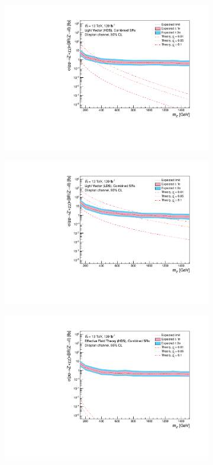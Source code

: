 \documentclass[12pt, a4paper]{book}
\begin{document}
\begin{figure}[!ht]
\begin{subfigure}[b]{0.49\textwidth}
      \centering
      \includegraphics[width=1\textwidth]{Limits/Model_independent/LV_HDS/mass_exclusion_comb.pdf}
   \end{subfigure}
   \hfill
   \begin{subfigure}[b]{0.49\textwidth}
      \centering
      \includegraphics[width=1\textwidth]{Limits/Model_independent/LV_LDS/mass_exclusion_comb.pdf}
   \end{subfigure}
   \hfill
	\begin{subfigure}[b]{0.49\textwidth}
      \centering
      \includegraphics[width=1\textwidth]{Limits/Model_independent/EFT_HDS/mass_exclusion_comb.pdf}

\end{subfigure}
\end{figure}
\end{document}
